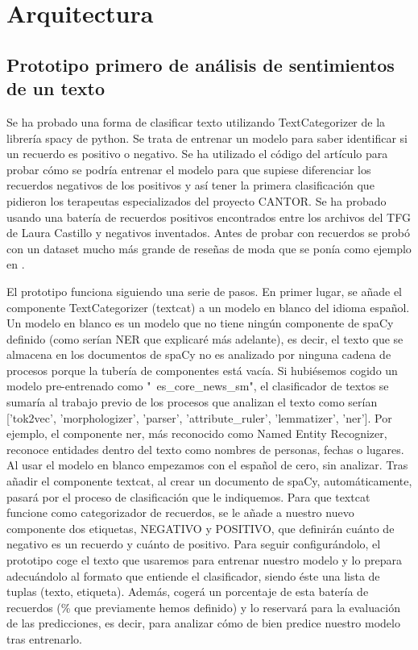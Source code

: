\chapter{Arquitectura}
\label{cap:arquitectura}

\section{Prototipo primero de análisis de sentimientos de un texto}

Se ha probado una forma de clasificar texto utilizando TextCategorizer \citep{categorizar} de la librería spacy de python. Se trata de entrenar un modelo para saber identificar si un recuerdo es positivo o negativo. Se ha utilizado el código del artículo \cite{prototipo} para probar cómo se podría entrenar el modelo para que supiese diferenciar los recuerdos negativos de los positivos y así tener la primera clasificación que pidieron los terapeutas especializados del proyecto CANTOR. Se ha probado usando una batería de recuerdos positivos encontrados entre los archivos del TFG de Laura Castillo \citep{reminiscencia} y negativos inventados. Antes de probar con recuerdos se probó con un dataset mucho más grande de reseñas de moda que se ponía como ejemplo en \cite{prototipo}. 

El prototipo funciona siguiendo una serie de pasos. En primer lugar, se añade el componente TextCategorizer (textcat) a un modelo en blanco del idioma español. Un modelo en blanco es un modelo que no tiene ningún componente de spaCy definido (como serían NER que explicaré más adelante), es decir, el texto que se almacena en los documentos de spaCy no es analizado por ninguna cadena de procesos porque la tubería de componentes está vacía. Si hubiésemos cogido un modelo pre-entrenado como "\ es\_core\_news\_sm", el clasificador de textos se sumaría al trabajo previo de los procesos que analizan el texto como serían ['tok2vec', 'morphologizer', 'parser', 'attribute\_ruler', 'lemmatizer', 'ner']. Por ejemplo, el componente ner, más reconocido como Named Entity Recognizer, reconoce entidades dentro del texto como nombres de personas, fechas o lugares. Al usar el modelo en blanco empezamos con el español de cero, sin analizar. Tras añadir el componente textcat, al crear un documento de spaCy, automáticamente, pasará por el proceso de clasificación que le indiquemos. Para que textcat funcione como categorizador de recuerdos, se le añade a nuestro nuevo componente dos etiquetas, NEGATIVO y POSITIVO, que definirán cuánto de negativo es un recuerdo y cuánto de positivo. Para seguir configurándolo, el prototipo coge el texto que usaremos para entrenar nuestro modelo y lo prepara adecuándolo al formato que entiende el clasificador, siendo éste una lista de tuplas (texto, etiqueta). Además, cogerá un porcentaje de esta batería de recuerdos (\% que previamente hemos definido) y lo reservará para la evaluación de las predicciones, es decir, para analizar cómo de bien predice nuestro modelo tras entrenarlo. 

